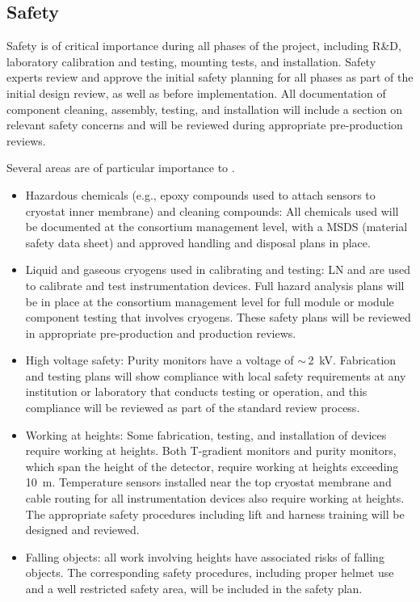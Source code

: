 \subsection{Safety}
Safety %
is of critical importance during %
all phases of the  project, including R\&D, laboratory calibration and testing, mounting tests, and installation. 
Safety experts %
review and approve the initial safety planning for all phases as part of the initial design review, as well as %
before implementation. 
All documentation of component cleaning, assembly, testing, and installation will include a section on relevant safety concerns and will be reviewed during appropriate pre-production reviews.

Several areas are of particular importance to .
\begin{itemize}
\item Hazardous chemicals (e.g., epoxy compounds used to attach sensors to cryostat inner membrane) and cleaning compounds:
  All chemicals used will be documented at the consortium management level, with a MSDS (material safety data sheet) and approved handling and disposal plans in place.

\item Liquid and gaseous cryogens used in calibrating and testing: LN and  %
are used to calibrate and test instrumentation devices.
  Full hazard analysis plans will be in place at the consortium management level for full module or
  module component testing that involves %
  cryogens. These safety plans will be reviewed in appropriate pre-production and production reviews.

\item High voltage safety:  Purity monitors %
have a voltage of $\sim\,$\SI{2}{kV}. Fabrication and testing plans will show compliance with local
   safety requirements at %
  any institution or laboratory that conducts testing or operation, and this compliance will be reviewed as part of the standard review process.


\item Working at heights: Some fabrication, testing, and installation of  devices require working at heights.
  Both T-gradient monitors and purity monitors, which span the height of the detector, require working at heights exceeding \SI{10}{m}.
  Temperature sensors installed near the top cryostat membrane and cable routing for all instrumentation devices
  also require working at heights. %
  The appropriate safety procedures including lift and harness training will be designed and reviewed. 
  
\item Falling objects: all work involving heights have associated risks of falling objects. The corresponding safety procedures, including proper helmet use 
and a well restricted safety area, will be included in the safety plan. 
\end{itemize}
